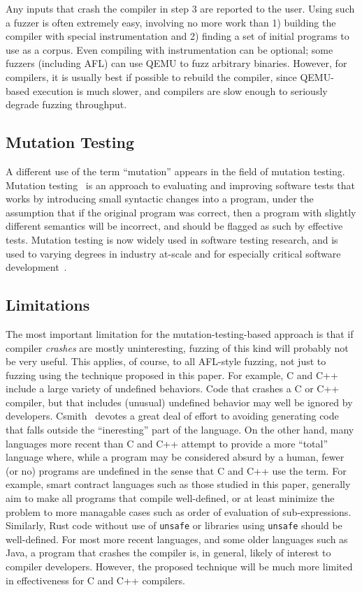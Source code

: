 Any inputs that crash the compiler in step 3 are reported to the user.  Using such a fuzzer is often extremely easy, involving no more work than 1) building the compiler with special instrumentation and 2) finding a set of initial programs to use as a corpus.  Even compiling with instrumentation can be optional; some fuzzers (including AFL) can use QEMU to fuzz arbitrary binaries.  However, for compilers, it is usually best if possible to rebuild the compiler, since QEMU-based execution is much slower, and compilers are slow enough to seriously degrade fuzzing throughput.

\subsection{Mutation Testing}

A different use of the term ``mutation'' appears in the field of mutation testing.  Mutation testing~\cite{MutationSurvey,budd1979mutation,demillo1978hints} is an approach to evaluating and improving software tests that works by introducing small syntactic changes into a program, under the assumption that if the original program was correct, then a program with slightly different semantics will be incorrect, and should be flagged as such by effective tests.  Mutation testing is now widely used in software testing research, and is used to varying degrees in industry at-scale and for especially critical software development~\cite{mutKernel,mutGoogle,mutFacebook}.

\subsection{Limitations}

The most important limitation for the mutation-testing-based approach is that if compiler \emph{crashes} are mostly uninteresting, fuzzing of this kind will probably not be very useful.  This applies, of course, to all AFL-style fuzzing, not just to fuzzing using the technique proposed in this paper.  For example, C and C++ include a large variety of undefined behaviors.  Code that crashes a C or C++ compiler, but that includes (unusual) undefined behavior may well be ignored by developers.  Csmith~\cite{csmith} devotes a great deal of effort to avoiding generating code that falls outside the ``ineresting'' part of the language.  On the other hand, many languages more recent than C and C++ attempt to provide a more ``total'' language where, while a program may be considered absurd by a human, fewer (or no) programs are undefined in the sense that C and C++ use the term.  For example, smart contract languages such as those studied in this paper, generally aim to make all programs that compile well-defined, or at least minimize the problem to more managable cases such as order of evaluation of sub-expressions.  Similarly, Rust code without use of {\tt unsafe} or libraries using {\tt unsafe} should be well-defined.  For most more recent languages, and some older languages such as Java, a program that crashes the compiler is, in general, likely of interest to compiler developers.  However, the proposed technique will be much more limited in effectiveness for C and C++ compilers.